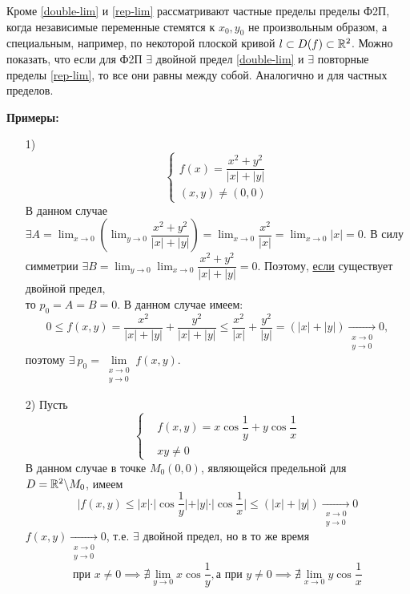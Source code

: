 \documentclass[../../main.tex]{subfiles}
\begin{document}
Кроме \eqref{double-lim} и \eqref{rep-lim} рассматривают частные
пределы пределы Ф2П, когда независимые переменные стемятся к $x_0, y_0$
не произвольным образом, а специальным, например, по некоторой плоской
кривой $l \subset{D(f)} \subset \mathbb{R}^2$. Можно показать, что если для Ф2П
$\exists$ двойной предел \eqref{double-lim} и $\exists$ повторные
пределы \eqref{rep-lim}, то все они равны между собой. Аналогично и
для частных пределов.

\textbf{Примеры:}
\begin{itemize}
	\item[1)] 
	\[\left\{\begin{aligned}
		f(x) = \dfrac{x^2 + y^2}{|x| + |y|} \\
		(x, y) \ne (0, 0)
	\end{aligned}\right.\]
	В данном случае $\exists A = \displaystyle\lim_{x \to 0}
	{(\lim_{y \to 0}{ \dfrac{x^2 + y^2}{|x| + |y|} })} =
	\displaystyle \lim_{x \to 0}{\dfrac{x^2}{|x|}} =
	\displaystyle \lim_{x \to 0}{|x|} = 0$. В силу симметрии
	$\exists B = \displaystyle\lim_{y \to 0}
	{\lim_{x \to 0}{ \dfrac{x^2 + y^2}{|x| + |y|} }} = 0$.
	Поэтому, \underline{если} существует двойной предел, \\
	то $p_0=A=B=0$. В данном случае имеем:
	\[
		0 \leq f(x, y) = 
		\dfrac{x^2}{|x| + |y|} + \dfrac{y^2}{|x| + |y|} \leq
		\dfrac{x^2}{|x|} + \dfrac{y^2}{|y|} = (|x| + |y|) 
		\underset{\substack{x \to 0 \\ y \to 0}}{\longrightarrow}0,
	\]
	поэтому $\exists\ p_0 = \underset{\substack{x \to 0 \\ y \to 0}}
	{\lim}f(x, y)$.
	
	\item[2)] Пусть \[\left\{\begin{aligned}
		&f(x, y) = x \cos{\dfrac{1}{y}} + y \cos{\dfrac{1}{x}} \\
		&xy \ne 0
	\end{aligned}\right.\]
	В данном случае в точке $M_0(0, 0)$, являющейся предельной для
	$D = \mathbb{R}^2 \backslash M_0$, имеем
	\[|f(x, y) \leq |x| \cdot |\cos{\dfrac{1}{y}}| + |y| \cdot 
	|\cos{\dfrac{1}{x}}| \leq (|x| + |y|) 
	\underset{\substack{x \to 0 \\ y \to 0}}{\longrightarrow}0\]
	$f(x, y) \underset{\substack{x \to 0 \\ y \to 0}}{\longrightarrow}0$, т.е. 
	$\exists$ двойной предел, но в то же время 
	\[\text{при } x \ne 0 \implies \nexists \displaystyle \lim_{y \to 0}
	x \cos{\dfrac{1}{y}}, \text{а при } y \ne 0 \implies
	\nexists \displaystyle \lim_{x \to 0} y \cos{\dfrac{1}{x}}\] 
	

\end{itemize}
\end{document}
